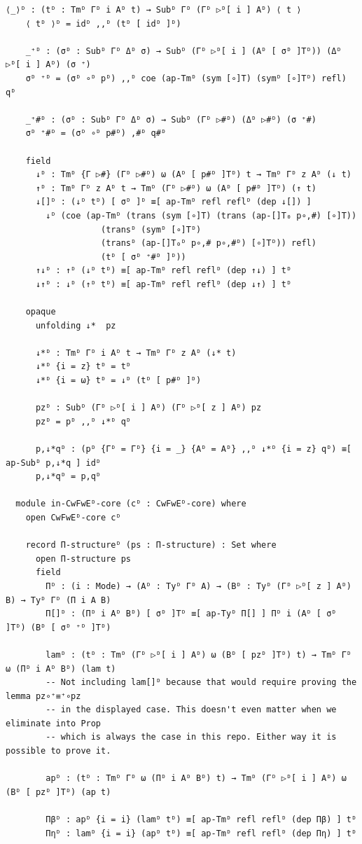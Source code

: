 \documentclass[10pt,a4paper]{article}
\theoremstyle{definition}
\theoremstyle{remark}
\begin{document}
{\begin{Verbatim}[breaklines=true,breakanywhere=true,fontsize=\scriptsize]
    ⟨_⟩ᴰ : (tᴰ : Tmᴰ Γᴰ i Aᴰ t) → Subᴰ Γᴰ (Γᴰ ▷ᴰ[ i ] Aᴰ) ⟨ t ⟩
    ⟨ tᴰ ⟩ᴰ = idᴰ ,,ᴰ (tᴰ [ idᴰ ]ᴰ)

    _⁺ᴰ : (σᴰ : Subᴰ Γᴰ Δᴰ σ) → Subᴰ (Γᴰ ▷ᴰ[ i ] (Aᴰ [ σᴰ ]Tᴰ)) (Δᴰ ▷ᴰ[ i ] Aᴰ) (σ ⁺)
    σᴰ ⁺ᴰ = (σᴰ ∘ᴰ pᴰ) ,,ᴰ coe (ap-Tmᴰ (sym [∘]T) (symᴰ [∘]Tᴰ) refl) qᴰ

    _⁺#ᴰ : (σᴰ : Subᴰ Γᴰ Δᴰ σ) → Subᴰ (Γᴰ ▷#ᴰ) (Δᴰ ▷#ᴰ) (σ ⁺#)
    σᴰ ⁺#ᴰ = (σᴰ ∘ᴰ p#ᴰ) ,#ᴰ q#ᴰ

    field
      ↓ᴰ : Tmᴰ {Γ ▷#} (Γᴰ ▷#ᴰ) ω (Aᴰ [ p#ᴰ ]Tᴰ) t → Tmᴰ Γᴰ z Aᴰ (↓ t)
      ↑ᴰ : Tmᴰ Γᴰ z Aᴰ t → Tmᴰ (Γᴰ ▷#ᴰ) ω (Aᴰ [ p#ᴰ ]Tᴰ) (↑ t)
      ↓[]ᴰ : (↓ᴰ tᴰ) [ σᴰ ]ᴰ ≡[ ap-Tmᴰ refl reflᴰ (dep ↓[]) ]
        ↓ᴰ (coe (ap-Tmᴰ (trans (sym [∘]T) (trans (ap-[]T₀ p∘,#) [∘]T))
                   (transᴰ (symᴰ [∘]Tᴰ)
                   (transᴰ (ap-[]T₀ᴰ p∘,# p∘,#ᴰ) [∘]Tᴰ)) refl)
                   (tᴰ [ σᴰ ⁺#ᴰ ]ᴰ))
      ↑↓ᴰ : ↑ᴰ (↓ᴰ tᴰ) ≡[ ap-Tmᴰ refl reflᴰ (dep ↑↓) ] tᴰ
      ↓↑ᴰ : ↓ᴰ (↑ᴰ tᴰ) ≡[ ap-Tmᴰ refl reflᴰ (dep ↓↑) ] tᴰ

    opaque
      unfolding ↓*  pz

      ↓*ᴰ : Tmᴰ Γᴰ i Aᴰ t → Tmᴰ Γᴰ z Aᴰ (↓* t)
      ↓*ᴰ {i = z} tᴰ = tᴰ
      ↓*ᴰ {i = ω} tᴰ = ↓ᴰ (tᴰ [ p#ᴰ ]ᴰ)

      pzᴰ : Subᴰ (Γᴰ ▷ᴰ[ i ] Aᴰ) (Γᴰ ▷ᴰ[ z ] Aᴰ) pz
      pzᴰ = pᴰ ,,ᴰ ↓*ᴰ qᴰ

      p,↓*qᴰ : (pᴰ {Γᴰ = Γᴰ} {i = _} {Aᴰ = Aᴰ} ,,ᴰ ↓*ᴰ {i = z} qᴰ) ≡[ ap-Subᴰ p,↓*q ] idᴰ
      p,↓*qᴰ = p,qᴰ

  module in-CwFwEᴰ-core (cᴰ : CwFwEᴰ-core) where
    open CwFwEᴰ-core cᴰ

    record Π-structureᴰ (ps : Π-structure) : Set where
      open Π-structure ps
      field
        Πᴰ : (i : Mode) → (Aᴰ : Tyᴰ Γᴰ A) → (Bᴰ : Tyᴰ (Γᴰ ▷ᴰ[ z ] Aᴰ) B) → Tyᴰ Γᴰ (Π i A B)
        Π[]ᴰ : (Πᴰ i Aᴰ Bᴰ) [ σᴰ ]Tᴰ ≡[ ap-Tyᴰ Π[] ] Πᴰ i (Aᴰ [ σᴰ ]Tᴰ) (Bᴰ [ σᴰ ⁺ᴰ ]Tᴰ)

        lamᴰ : (tᴰ : Tmᴰ (Γᴰ ▷ᴰ[ i ] Aᴰ) ω (Bᴰ [ pzᴰ ]Tᴰ) t) → Tmᴰ Γᴰ ω (Πᴰ i Aᴰ Bᴰ) (lam t)
        -- Not including lam[]ᴰ because that would require proving the lemma pz∘⁺≡⁺∘pz
        -- in the displayed case. This doesn't even matter when we eliminate into Prop
        -- which is always the case in this repo. Either way it is possible to prove it.

        apᴰ : (tᴰ : Tmᴰ Γᴰ ω (Πᴰ i Aᴰ Bᴰ) t) → Tmᴰ (Γᴰ ▷ᴰ[ i ] Aᴰ) ω (Bᴰ [ pzᴰ ]Tᴰ) (ap t)

        Πβᴰ : apᴰ {i = i} (lamᴰ tᴰ) ≡[ ap-Tmᴰ refl reflᴰ (dep Πβ) ] tᴰ
        Πηᴰ : lamᴰ {i = i} (apᴰ tᴰ) ≡[ ap-Tmᴰ refl reflᴰ (dep Πη) ] tᴰ


\end{Verbatim}}
\end{document}
